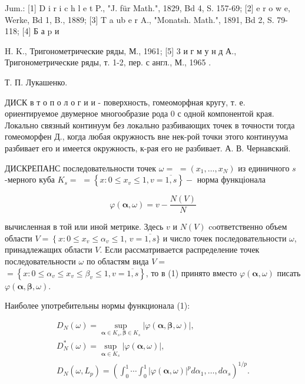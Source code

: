 \documentclass[10pt]{article}
\begin{document}
Jum.: [1] D i r i c h l e t P., "J. für Math.", 1829, Bd 4, S. 157-69; [2] e r o w e, Werke, Bd 1, B., 1889; [3] T a ub e r A., "Monatsh. Math.", 1891, Bd 2, S. 79-118; [4] Б а p и

H. K., Тригонометрические ряды, М., 1961; [5] 3 и г м у н д А., Тригонометрические ряды, т. 1-2, пер. с англ., М., 1965 .



Т. П. Лукашенко.



ДИСК в т о п о л о г и и - поверхность, гомеоморфная кругу, т. е. ориентируемое двумерное многообразие рода 0 с одной компонентой края. Локально связный континуум без локально разбивающих точек в точности тогда гомеоморфен Д., когда любая окружность вне нек-рой точки этого континуума разбивает его и имеется окружность, к-рая его не разбивает. А. В. Чернавский.



ДИСКРЕПАНС последовательности точек $\omega=$ $=\left(x_{1}, \ldots, x_{N}\right)$ из единичного $s$-мерного куба $K_{s}=$ $=\left\{x: 0 \leqslant x_{v} \leqslant 1, v=\overline{1, s}\right\}-$ норма функціонала



\[

\varphi(\boldsymbol{\alpha}, \omega)=v-\frac{N(V)}{N}

\]



вычисленная в той или иной метрике. Здесь $v$ и $N(V)$ coответственно объем области $V=\left\{x: 0 \leqslant x_{v} \leqslant \alpha_{v} \leqslant 1\right.$, $v=\overline{1, s}\}$ и число точек последовательности $\omega$, принадлежащих области $V$. Если рассматривается распределение точек последовательности $\omega$ по областям вида $V=$ $=\left\{x: 0 \leqslant \alpha_{v} \leqslant x_{v} \leqslant \beta_{v} \leqslant 1, v=\overline{1, s}\right\}$, то в (1) принято вместо $\varphi(\boldsymbol{\alpha}, \omega)$ писать $\varphi(\boldsymbol{\alpha}, \boldsymbol{\beta}, \omega)$.



Наиболее употребительны нормы функционала (1):



\[

\begin{gathered}

D_{N}(\omega)=\sup _{\boldsymbol{\alpha} \in K_{s}, \boldsymbol{\beta} \in K_{s}}|\varphi(\boldsymbol{\alpha}, \boldsymbol{\beta}, \omega)|, \\

D_{N}^{*}(\omega)=\sup _{\boldsymbol{\alpha} \in K_{s}}|\varphi(\boldsymbol{\alpha}, \omega)|, \\

D_{N}\left(\omega, L_{p}\right)=\left(\int_{0}^{1} \cdots \int_{0}^{1}|\varphi(\boldsymbol{\alpha}, \omega)|^{p} d \alpha_{1}, \ldots, d \alpha_{s}\right)^{1 / p} .

\end{gathered}

\]
\end{document}
